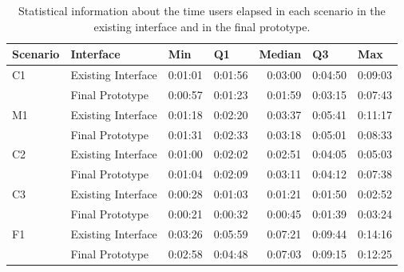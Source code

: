 \begin{table}[tb]
  \caption{Statistical information about the time users elapsed in each scenario in the existing interface and in the final prototype.}
	\label{tab:duration-stats}
  \begin{tabular}{@{}llrrrrr@{}}
  \toprule
  Scenario & Interface          & \multicolumn{1}{l}{Min} & \multicolumn{1}{l}{Q1} & \multicolumn{1}{l}{Median} & \multicolumn{1}{l}{Q3} & \multicolumn{1}{l}{Max} \\ \midrule
  C1       & Existing Interface & 0:01:01                 & 0:01:56                & 0:03:00                    & 0:04:50                & 0:09:03                 \\
           & Final Prototype    & 0:00:57                 & 0:01:23                & 0:01:59                    & 0:03:15                & 0:07:43                 \\ \midrule
  M1       & Existing Interface & 0:01:18                 & 0:02:20                & 0:03:37                    & 0:05:41                & 0:11:17                 \\
           & Final Prototype    & 0:01:31                 & 0:02:33                & 0:03:18                    & 0:05:01                & 0:08:33                 \\ \midrule
  C2       & Existing Interface & 0:01:00                 & 0:02:02                & 0:02:51                    & 0:04:05                & 0:05:03                 \\
           & Final Prototype    & 0:01:04                 & 0:02:09                & 0:03:11                    & 0:04:12                & 0:07:38                 \\ \midrule
  C3       & Existing Interface & 0:00:28                 & 0:01:03                & 0:01:21                    & 0:01:50                & 0:02:52                 \\
           & Final Prototype    & 0:00:21                 & 0:00:32                & 0:00:45                    & 0:01:39                & 0:03:24                 \\ \midrule
  F1       & Existing Interface & 0:03:26                 & 0:05:59                & 0:07:21                    & 0:09:44                & 0:14:16                 \\
           & Final Prototype    & 0:02:58                 & 0:04:48                & 0:07:03                    & 0:09:15                & 0:12:25                 \\ \midrule

\end{tabular}
\end{table}
